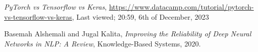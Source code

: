 \documentclass[lettersize,journal]{IEEEtran}
\begin{document}
\begin{thebibliography}{1}

{\it{PyTorch vs Tensorflow vs Keras}}, \href{https://www.datacamp.com/tutorial/pytorch-vs-tensorflow-vs-keras}{https://www.datacamp.com/tutorial/pytorch-vs-tensorflow-vs-keras}, Last viewed; 20:59, 6th of December, 2023

Basemah Alshemali and Jugal Kalita, {\it{Improving the Reliability of Deep Neural Networks in NLP: A Review}}, Knowledge-Based Systems, 2020.


\end{thebibliography}
\end{document}
